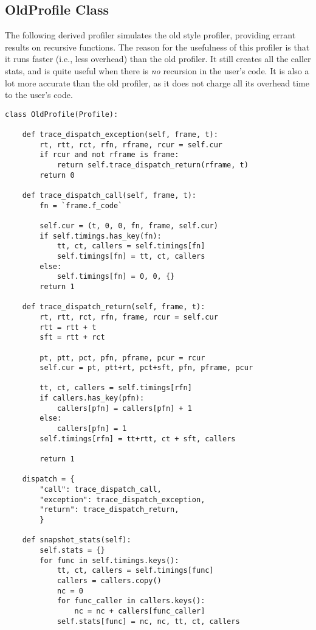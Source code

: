 \subsection{OldProfile Class \label{profile-old}}

The following derived profiler simulates the old style profiler,
providing errant results on recursive functions. The reason for the
usefulness of this profiler is that it runs faster (i.e., less
overhead) than the old profiler.  It still creates all the caller
stats, and is quite useful when there is \emph{no} recursion in the
user's code.  It is also a lot more accurate than the old profiler, as
it does not charge all its overhead time to the user's code.

\begin{verbatim}
class OldProfile(Profile):

    def trace_dispatch_exception(self, frame, t):
        rt, rtt, rct, rfn, rframe, rcur = self.cur
        if rcur and not rframe is frame:
            return self.trace_dispatch_return(rframe, t)
        return 0

    def trace_dispatch_call(self, frame, t):
        fn = `frame.f_code`

        self.cur = (t, 0, 0, fn, frame, self.cur)
        if self.timings.has_key(fn):
            tt, ct, callers = self.timings[fn]
            self.timings[fn] = tt, ct, callers
        else:
            self.timings[fn] = 0, 0, {}
        return 1

    def trace_dispatch_return(self, frame, t):
        rt, rtt, rct, rfn, frame, rcur = self.cur
        rtt = rtt + t
        sft = rtt + rct

        pt, ptt, pct, pfn, pframe, pcur = rcur
        self.cur = pt, ptt+rt, pct+sft, pfn, pframe, pcur

        tt, ct, callers = self.timings[rfn]
        if callers.has_key(pfn):
            callers[pfn] = callers[pfn] + 1
        else:
            callers[pfn] = 1
        self.timings[rfn] = tt+rtt, ct + sft, callers

        return 1

    dispatch = {
        "call": trace_dispatch_call,
        "exception": trace_dispatch_exception,
        "return": trace_dispatch_return,
        }

    def snapshot_stats(self):
        self.stats = {}
        for func in self.timings.keys():
            tt, ct, callers = self.timings[func]
            callers = callers.copy()
            nc = 0
            for func_caller in callers.keys():
                nc = nc + callers[func_caller]
            self.stats[func] = nc, nc, tt, ct, callers
\end{verbatim}


